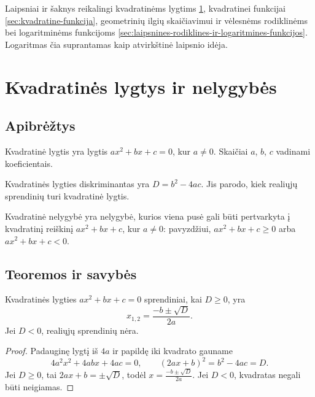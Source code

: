 Laipsniai ir šaknys reikalingi kvadratinėms lygtims \ref{sec:kvadratines-lygtys-ir-nelygybes}, kvadratinei funkcijai \ref{sec:kvadratine-funkcija}, geometrinių ilgių skaičiavimui ir vėlesnėms rodiklinėms bei logaritminėms funkcijoms \ref{sec:laipsnines-rodiklines-ir-logaritmines-funkcijos}. Logaritmas čia suprantamas kaip atvirkštinė laipsnio idėja.

\section{Kvadratinės lygtys ir nelygybės}\label{sec:kvadratines-lygtys-ir-nelygybes}

\subsection{Apibrėžtys}

\begin{apibreztis}
Kvadratinė lygtis yra lygtis $ax^2+bx+c=0$, kur $a\ne0$. Skaičiai $a$, $b$, $c$ vadinami koeficientais.
\end{apibreztis}

\begin{apibreztis}
Kvadratinės lygties diskriminantas yra $D=b^2-4ac$. Jis parodo, kiek realiųjų sprendinių turi kvadratinė lygtis.
\end{apibreztis}

\begin{apibreztis}
Kvadratinė nelygybė yra nelygybė, kurios viena pusė gali būti pertvarkyta į kvadratinį reiškinį $ax^2+bx+c$, kur $a\ne0$: pavyzdžiui, $ax^2+bx+c\ge0$ arba $ax^2+bx+c<0$.
\end{apibreztis}

\subsection{Teoremos ir savybės}

\begin{teorema}
Kvadratinės lygties $ax^2+bx+c=0$ sprendiniai, kai $D\ge0$, yra
\[
x_{1,2}=\frac{-b\pm\sqrt D}{2a}.
\]
Jei $D<0$, realiųjų sprendinių nėra.
\end{teorema}
\begin{proof}
Padauginę lygtį iš $4a$ ir papildę iki kvadrato gauname
\[
4a^2x^2+4abx+4ac=0,\qquad (2ax+b)^2=b^2-4ac=D.
\]
Jei $D\ge0$, tai $2ax+b=\pm\sqrt D$, todėl $x=\frac{-b\pm\sqrt D}{2a}$. Jei $D<0$, kvadratas negali būti neigiamas.
\end{proof}

